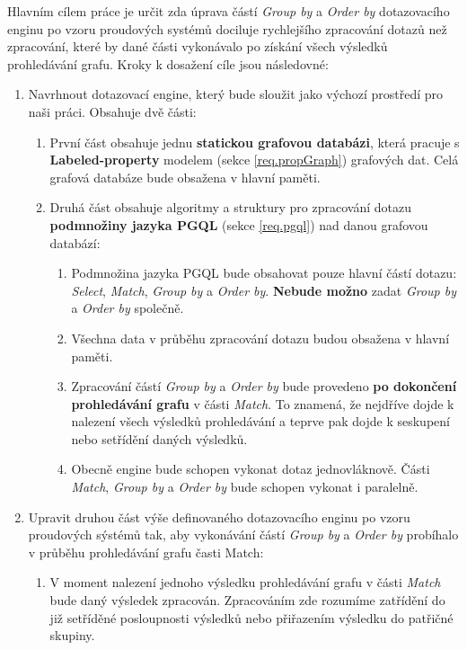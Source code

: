 Hlavním cílem práce je určit zda úprava částí \textit{Group by} a \textit{Order by} dotazovacího enginu po vzoru proudových systémů dociluje rychlejšího zpracování dotazů než zpracování, které by dané části vykonávalo po získání všech výsledků prohledávání grafu.
Kroky k dosažení cíle jsou následovné:
\begin{enumerate}
\item
Navrhnout dotazovací engine, který bude sloužit jako výchozí prostředí pro naši práci.
Obsahuje dvě části:
\begin{enumerate}
\item První část obsahuje jednu \textbf{statickou grafovou databázi}, která pracuje s \textbf{Labeled-property} modelem (sekce \ref{req.propGraph}) grafových dat.
Celá grafová databáze bude obsažena v hlavní paměti.

\item Druhá část obsahuje algoritmy a struktury pro zpracování dotazu \textbf{podmnožiny jazyka PGQL} (sekce \ref{req.pgql}) nad danou grafovou databází:
    \begin{enumerate}
    \item Podmnožina jazyka PGQL bude obsahovat pouze hlavní částí dotazu: \textit{Select}, \textit{Match}, \textit{Group by} a \textit{Order by}.
    \textbf{Nebude možno} zadat \textit{Group by} a \textit{Order by} společně.
    \item Všechna data v průběhu zpracování dotazu budou obsažena v hlavní paměti.
    \item Zpracování částí \textit{Group by} a \textit{Order by} bude provedeno \textbf{po dokončení prohledávání grafu} v části \textit{Match}.
    To znamená, že nejdříve dojde k nalezení všech výsledků prohledávání a teprve pak dojde k seskupení nebo setřídění daných výsledků.
    \item Obecně engine bude schopen vykonat dotaz jednovláknově.
    Části \textit{Match}, \textit{Group by} a \textit{Order by} bude schopen vykonat i paralelně.
    \end{enumerate}
\end{enumerate}

\item
Upravit druhou část výše definovaného dotazovacího enginu po vzoru proudových sýstémů tak, aby vykonávání částí \textit{Group by} a \textit{Order by} probíhalo v průběhu prohledávání grafu časti Match:
\begin{enumerate}

\item
V moment nalezení jednoho výsledku prohledávání grafu v části \textit{Match} bude daný výsledek zpracován.
Zpracováním zde rozumíme zatřídění do již setříděné posloupnosti výsledků nebo přiřazením výsledku do patřičné skupiny.


\end{enumerate}
\end{enumerate}

